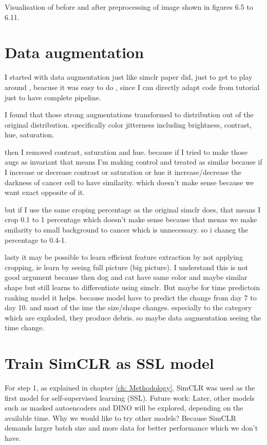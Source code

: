 Visualisation of before and after preprocessing of image shown in figures 6.5 to 6.11.

\section{Data augmentation} \label{sec:data augmentation}

I started with data augmentation just like simclr paper did, just to get 
to play around , beacuse it was easy to do , since I can directly adapt code 
from tutorial just to have complete pipeline.

I found that those strong augmentations transformed to distribution out of 
the original distribution. specifically color jitterness including brightness, 
contrast, hue, saturation.

then I removed contrast, saturation and hue. because if I tried to make 
those augs as invariant that means I'm making control and treated as 
similar because if I increase or decrease contrast or 
saturation or hue it increase/decrease the darkness of cancer cell to 
have similarity.
which doesn't make sense because we want exact opposite of it.

but if I use the same croping percentage as the original simclr does, 
that means I crop 0.1  to 1 percentage which doesn't make sense because that 
menas we make smilarity to small background to cancer which is unnecessary. 
so i chaneg the percentage to 0.4-1.

lasty it may be possible to learn efficient feature extraction by not 
applying cropping, ie learn by seeing full picture (big picture). 
I understand this is not good argument because then dog and cat have same 
color and maybe similar shape but still learns to differentiate using simclr.
But maybe for time predictoin ranking model it helps. because model have to 
predict the change from day 7 to day 10. and most of the ime the size/shape
 changes. especially to the category which are exploded, they produce debris. 
 so maybe data augmentation seeing the time change. 





\section{Train SimCLR as SSL model}
For step 1, as explained in chapter \ref{ch: Methodology}, SimCLR was used as the first model for self-supervised learning (SSL). 
Future work: Later, other models such as masked autoencoders and DINO will be explored, depending on the available time.
Why we would like to try other models? Because SimCLR demands larger batch size and more data for better performance which we don't have.



